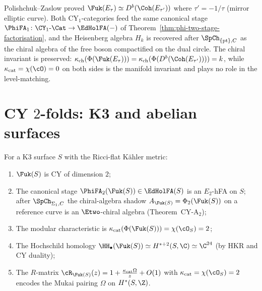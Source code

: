 \begin{remark}
\label{rem:hms-elliptic}
Polishchuk--Zaslow proved $\Fuk(E_\tau) \simeq D^b(\Coh(E_{\tau'}))$
where $\tau' = -1/\tau$ (mirror elliptic curve). Both CY$_1$-categories
feed the same canonical stage
$\PhiFA_1 \colon \CY_1\text{-}\Cat \to \EdHolFA(-)$ of
Theorem~\ref{thm:phi-two-stage-factorisation}, and the Heisenberg
algebra $H_k$ is recovered after $\SpCh_{\{\mathrm{pt}\}, C}$
as the chiral algebra of the free boson compactified on the dual
circle. The chiral invariant is preserved:
$\kappa_{\mathrm{ch}}(\Phi(\Fuk(E_\tau)))
 = \kappa_{\mathrm{ch}}(\Phi(D^b(\Coh(E_{\tau'}))))
 = k$, while $\kappa_{\mathrm{cat}} = \chi(\cO) = 0$ on both sides
is the manifold invariant and plays no role in the level-matching.
\end{remark}


\section{CY \texorpdfstring{$2$}{2}-folds: K3 and abelian surfaces}
\label{sec:fukaya-cy2}

\begin{proposition}[K3 surface]
\label{prop:fukaya-k3}
For a K3 surface $S$ with the Ricci-flat K\"ahler metric:
\begin{enumerate}[label=(\roman*)]
 \item $\Fuk(S)$ is CY of dimension $2$;
 \item The canonical stage $\PhiFA_2(\Fuk(S)) \in \EdHolFA(S)$ is an
 $E_2$-hFA on $S$; after $\SpCh_{\Sigma_1, C}$ the chiral-algebra
 shadow $A_{\Fuk(S)} = \Phi_2(\Fuk(S))$ on a reference curve is an
 $\Etwo$-chiral algebra (Theorem~CY-A$_2$);
 \item The modular characteristic is
 $\kappa_{\mathrm{cat}}(\Phi(\Fuk(S))) = \chi(\cO_S) = 2$;
 \item The Hochschild homology
 $\HH_\bullet(\Fuk(S)) \simeq
 H^{*+2}(S, \C) \simeq \C^{24}$ (by HKR and CY duality);
 \item The $R$-matrix
 $\cR_{\Fuk(S)}(z) = 1 + \frac{\kappa_{\mathrm{cat}}\Omega}{z} + O(1)$
 with $\kappa_{\mathrm{cat}} = \chi(\cO_S) = 2$ encodes the
 Mukai pairing $\Omega$ on $H^*(S, \Z)$.
\end{enumerate}
\end{proposition}


